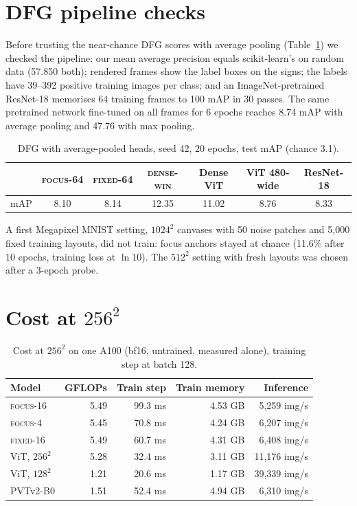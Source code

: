 \documentclass[10pt]{article}
\newcommand{\focus}{\textsc{focus}}
\newcommand{\fixed}{\textsc{fixed}}
\newcommand{\densewin}{\textsc{dense-win}}
\begin{document}
\section{DFG pipeline checks}
\label{app:dfg}
Before trusting the near-chance DFG scores with average pooling (Table~\ref{tab:avgpool}) we
checked the pipeline: our mean average precision equals scikit-learn's on random data (57.850
both); rendered frames show the label boxes on the signs; the labels have 39--392 positive
training images per class; and an ImageNet-pretrained ResNet-18 memorises 64 training frames to
100 mAP in 30 passes. The same pretrained network fine-tuned on all frames for 6 epochs reaches
8.74 mAP with average pooling and 47.76 with max pooling.
\begin{table}[h]
\centering
\caption{DFG with average-pooled heads, seed 42, 20 epochs, test mAP (chance 3.1).}
\label{tab:avgpool}
\begin{tabular}{lcccccc}
\toprule
& \focus-64 & \fixed-64 & \densewin & Dense ViT & ViT 480-wide & ResNet-18 \\
\midrule
mAP & 8.10 & 8.14 & 12.35 & 11.02 & 8.76 & 8.33 \\
\bottomrule
\end{tabular}
\end{table}
A first Megapixel MNIST setting, $1024^2$ canvases with 50 noise patches and 5{,}000 fixed
training layouts, did not train: focus anchors stayed at chance (11.6\% after 10 epochs, training
loss at $\ln 10$). The $512^2$ setting with fresh layouts was chosen after a 3-epoch probe.

\section{Cost at $256^2$}
\label{app:cost}
\begin{table}[h]
\centering
\caption{Cost at $256^2$ on one A100 (bf16, untrained, measured alone), training step at batch
128.}
\begin{tabular}{lrrrr}
\toprule
Model & GFLOPs & Train step & Train memory & Inference \\
\midrule
\focus-16 & 5.49 & 99.3 ms & 4.53 GB & 5{,}259 img/s \\
\focus-4 & 5.45 & 70.8 ms & 4.24 GB & 6{,}207 img/s \\
\fixed-16 & 5.49 & 60.7 ms & 4.31 GB & 6{,}408 img/s \\
ViT, $256^2$ & 5.28 & 32.4 ms & 3.11 GB & 11{,}176 img/s \\
ViT, $128^2$ & 1.21 & 20.6 ms & 1.17 GB & 39{,}339 img/s \\
PVTv2-B0 & 1.51 & 52.4 ms & 4.94 GB & 6{,}310 img/s \\
\bottomrule
\end{tabular}
\end{table}
\end{document}
